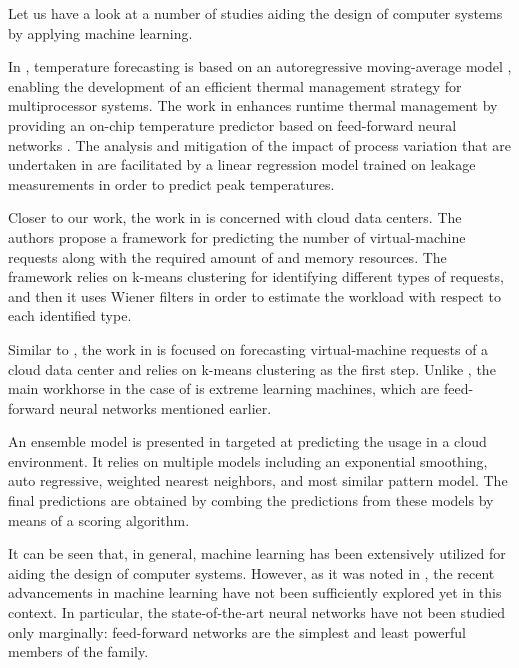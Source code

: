 Let us have a look at a number of studies aiding the design of computer systems
by applying machine learning.

In \cite{coskun2008}, temperature forecasting is based on an autoregressive
moving-average model \cite{hastie2009}, enabling the development of an efficient
thermal management strategy for multiprocessor systems. The work in
\cite{kumar2010} enhances runtime thermal management by providing an on-chip
temperature predictor based on feed-forward neural networks \cite{hastie2009}.
The analysis and mitigation of the impact of process variation that are
undertaken in \cite{juan2014} are facilitated by a linear regression model
\cite{hastie2009} trained on leakage measurements in order to predict peak
temperatures.

Closer to our work, the work in \cite{dabbagh2015} is concerned with cloud data
centers. The authors propose a framework for predicting the number of
virtual-machine requests along with the required amount of  and memory
resources. The framework relies on k-means clustering \cite{hastie2009} for
identifying different types of requests, and then it uses Wiener filters in
order to estimate the workload with respect to each identified type.

Similar to \cite{dabbagh2015}, the work in \cite{ismaeel2015} is focused on
forecasting virtual-machine requests of a cloud data center and relies on
k-means clustering as the first step. Unlike \cite{dabbagh2015}, the main
workhorse in the case of \cite{ismaeel2015} is extreme learning machines, which
are feed-forward neural networks mentioned earlier.

An ensemble model \cite{hastie2009} is presented in \cite{cao2014} targeted at
predicting the  usage in a cloud environment. It relies on multiple
models including an exponential smoothing, auto regressive, weighted nearest
neighbors, and most similar pattern model. The final predictions are obtained by
combing the predictions from these models by means of a scoring algorithm.

It can be seen that, in general, machine learning has been extensively utilized
for aiding the design of computer systems. However, as it was noted in
, the recent advancements in machine learning have not been
sufficiently explored yet in this context. In particular, the state-of-the-art
neural networks have not been studied only marginally: feed-forward networks are
the simplest and least powerful members of the family.

